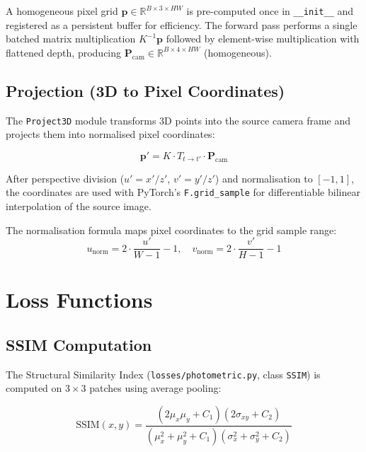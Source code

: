 \documentclass[10pt, a4paper, twocolumn]{article}
\begin{document}
A homogeneous pixel grid $\mathbf{p} \in \mathbb{R}^{B \times 3 \times HW}$ is pre-computed once in \texttt{\_\_init\_\_} and registered as a persistent buffer for efficiency. The forward pass performs a single batched matrix multiplication $K^{-1}\mathbf{p}$ followed by element-wise multiplication with flattened depth, producing $\mathbf{P}_{\text{cam}} \in \mathbb{R}^{B \times 4 \times HW}$ (homogeneous).

\subsection{Projection (3D to Pixel Coordinates)}

The \texttt{Project3D} module transforms 3D points into the source camera frame and projects them into normalised pixel coordinates:

\begin{equation}
\mathbf{p}' = K \cdot T_{t \to t'} \cdot \mathbf{P}_{\text{cam}}
\end{equation}

After perspective division ($u' = x'/z'$, $v' = y'/z'$) and normalisation to $[-1, 1]$, the coordinates are used with PyTorch's \texttt{F.grid\_sample} for differentiable bilinear interpolation of the source image.

The normalisation formula maps pixel coordinates to the grid sample range:
\begin{equation}
u_{\text{norm}} = 2 \cdot \frac{u'}{W-1} - 1, \quad v_{\text{norm}} = 2 \cdot \frac{v'}{H-1} - 1
\end{equation}

\section{Loss Functions}
\label{sec:losses}

\subsection{SSIM Computation}

The Structural Similarity Index (\texttt{losses/photometric.py}, class \texttt{SSIM}) is computed on $3\times3$ patches using average pooling:

\begin{equation}
\text{SSIM}(x,y) = \frac{(2\mu_x\mu_y + C_1)(2\sigma_{xy} + C_2)}{(\mu_x^2 + \mu_y^2 + C_1)(\sigma_x^2 + \sigma_y^2 + C_2)}
\end{equation}
\end{document}
